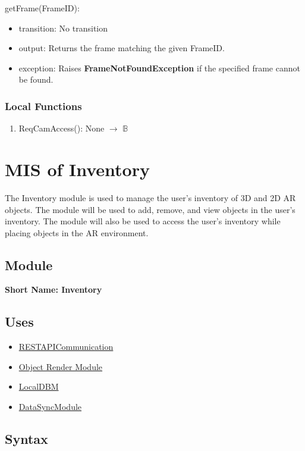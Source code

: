 \documentclass[12pt, titlepage]{article}
\begin{document}
\noindent getFrame(FrameID):
\begin{itemize}
\item transition: No transition
\item output: Returns the frame matching the given FrameID.
\item exception: Raises \textbf{FrameNotFoundException} if the specified frame cannot be found.
\end{itemize}

\subsubsection{Local Functions}

\begin{enumerate}
  \item ReqCamAccess(): None $\rightarrow$ $\mathbb{B}$
\end{enumerate}


\section{MIS of Inventory} \label{inventory}

The Inventory module is used to manage the user's inventory of 3D and 2D AR objects. The module will be used to add, remove, and view objects in the user's inventory. The module will also be used to access the user's inventory while placing objects in the AR environment.

\subsection{Module}

\textbf{Short Name: Inventory}

\subsection{Uses}
\begin{itemize}
  \item \hyperref[rest-api]{RESTAPICommunication}
  \item \hyperref[ObjectRenderModule]{Object Render Module}
  \item \hyperref[local-dbm]{LocalDBM}
  \item \hyperref[DataSync]{DataSyncModule}
\end{itemize}

\subsection{Syntax}
\end{document}
